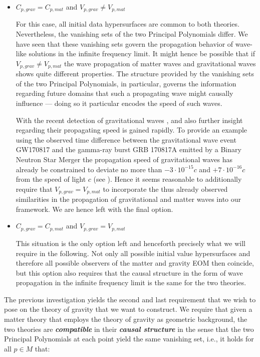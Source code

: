 \begin{itemize}
\item $C_{p,grav} = C_{p,mat}$ and $V_{p,grav} \neq V_{p,mat}$ 

For this case, all initial data hypersurfaces are common to both theories. Nevertheless, the vanishing sets of the two Principal Polynomials differ. We have seen that these vanishing sets govern the propagation behavior of wave-like solutions in the infinite frequency limit. It might hence be possible that if $V_{p,grav} \neq V_{p,mat}$ the wave propagation of matter waves and gravitational waves shows quite different properties. The structure provided by the vanishing sets of the two Principal Polynomials, in particular, governs the information regarding future domains that such a propagating wave might causally influence — doing so it particular encodes the speed of such waves. 

With the recent detection of gravitational waves \cite{2017ApJ...848L..12A}, \cite{2017PhRvL.119n1101A} and \cite{2016PhRvL.116f1102A} also further insight regarding their propagating speed is gained rapidly. 
To provide an example using the observed time difference between the gravitational wave event GW170817 and the gamma-ray burst GRB 170817A emitted by a Binary Neutron Star Merger the propagation speed of gravitational waves has already be constrained to deviate no more than $-3\cdot 10^{{-}15}c$ and $+7\cdot 10^{{-}16}c$ from the speed of light $c$ (see \cite{2017ApJ...848L..13A}). Hence it seems reasonable to additionally require that $V_{p,grav} = V_{p,mat}$ to incorporate the thus already observed similarities in the propagation of gravitational and matter waves into our framework. We are hence left with the final option.
\item $C_{p,grav} = C_{p,mat}$ and $V_{p,grav} = V_{p,mat}$ 

This situation is the only option left and henceforth precisely what we will require in the following. Not only all possible initial value hypersurfaces and therefore all possible observers of the matter and gravity EOM then coincide, but this option also requires that the causal structure in the form of wave propagation in the infinite frequency limit is the same for the two theories.  
\end{itemize}
The previous investigation yields the second and last requirement that we wish to pose on the theory of gravity that we want to construct. We require that given a matter theory that employs the theory of gravity as geometric background, the two theories are \textit{\textbf{compatible}} in their \textit{\textbf{causal structure}} in the sense that the two Principal Polynomials at each point yield the same vanishing set, i.e., it holds for all $p \in M$ that: 

